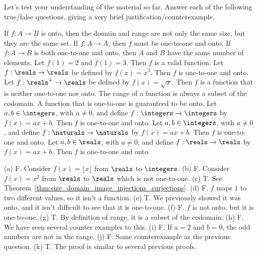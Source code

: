 \newpage
\begin{exer}
Let's test your understanding of the material so far. Answer each of the following
true/false questions, giving a very brief justification/counterexample.
\begin{enumerate}[(a)]
\itemtf 
If $f:A\to B$ is onto, then the domain and range are not only the same size, but they are the same set.
\bigskip
\itemtf
If $f:A\to A$, then $f$ must be one-to-one and onto.
\bigskip
\itemtf
If $f:A\to B$ is both one-to-one and onto, then $A$ and $B$ have the same number of elements.
\bigskip
\itemtf
Let $f(1)=2$ and $f(1)=3$.  Then $f$ is a valid function.
\bigskip
\itemtf
Let $f:\reals\to \reals$ be defined by $f(x)=x^3$.  Then $f$ is one-to-one and onto.
\bigskip
\itemtf
Let $f:\reals^{+}\to \reals$ be defined by $f(x)=\sqrt{x}$.  Then $f$ is a function that is neither 
one-to-one nor onto.
\bigskip
\itemtf
The range of a function is always a subset of the codomain.
\bigskip
\itemtf
A function that is one-to-one is guaranteed to be onto.
\bigskip
\itemtf
Let $a,b\in\integers$, with $a\neq 0$, and define $f:\integers\to\integers$ by $f(x)=ax+b$.
Then $f$ is one-to-one and onto.
\bigskip
\itemtf
Let $a,b\in\integers$, with $a\neq 0$, and define $f:\naturals\to\naturals$  by $f(x)=ax+b$.
Then $f$ is one-to-one and onto.
\bigskip
\itemtf
Let $a,b\in\reals$, with $a\neq 0$, and define $f:\reals\to\reals$ by $f(x)=ax+b$.
Then $f$ is one-to-one and onto.
\end{enumerate}
\begin{answer}
(a) F.  Consider $f(x)=\lfloor x \rfloor$ from $\reals$ to $\integers$.
(b) F.  Consider $f(x)=x^2$ from $\reals$ to $\reals$ which is not one-to-one.
(c) T.  See Theorem~\ref{thm:size_domain_image_injections_surjections}.
(d) F.  $f$ maps $1$ to two different values, so it isn't a function.
(e) T.  We previously showed it was onto, and it isn't difficult to see that it is one-to-one.
(f) F. $f$ is not onto, but it is one-to-one.
(g) T.  By definition of range, it is a subset of the codomain.
(h) F.  We have seen several counter examples to this.
(i) F.  If $a=2$ and $b=0$, the odd numbers are not in the range.
(j) F.  Same counterexample as the previous question.
(k) T.  The proof is similar to several previous proofs.
\end{answer}
\end{exer}



